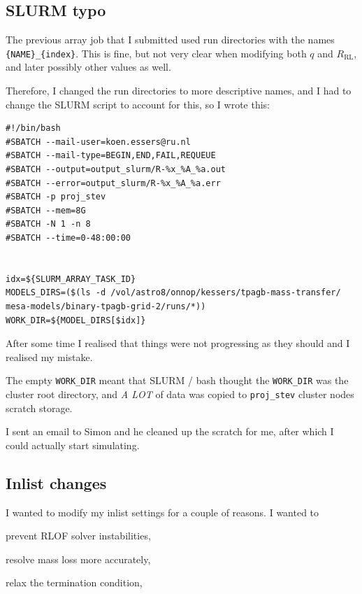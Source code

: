 \documentclass[a4paper,10pt]{article}
\begin{document}
\subsection{SLURM typo}
The previous array job that I submitted used run directories with the names \lstinline[style=output, breaklines=true]|{NAME}_{index}|. This is fine, but not very clear when modifying both \(q\) and \(R _\text{RL}\), and later possibly other values as well.

Therefore, I changed the run directories to more descriptive names, and I had to change the SLURM script to account for this, so I wrote this:

\begin{verbatim}
#!/bin/bash
#SBATCH --mail-user=koen.essers@ru.nl
#SBATCH --mail-type=BEGIN,END,FAIL,REQUEUE
#SBATCH --output=output_slurm/R-%x_%A_%a.out
#SBATCH --error=output_slurm/R-%x_%A_%a.err
#SBATCH -p proj_stev
#SBATCH --mem=8G
#SBATCH -N 1 -n 8 
#SBATCH --time=0-48:00:00


idx=${SLURM_ARRAY_TASK_ID}
MODELS_DIRS=($(ls -d /vol/astro8/onnop/kessers/tpagb-mass-transfer/ mesa-models/binary-tpagb-grid-2/runs/*))
WORK_DIR=${MODEL_DIRS[$idx]}
\end{verbatim}

After some time I realised that things were not progressing as they should and I realised my mistake.

The empty \lstinline[style=output, breaklines=true]|WORK_DIR| meant that SLURM / bash thought the \lstinline[style=output, breaklines=true]|WORK_DIR| was the cluster root directory, and \emph{A LOT} of data was copied to \lstinline[style=output, breaklines=true]|proj_stev| cluster nodes scratch storage.

I sent an email to Simon and he cleaned up the scratch for me, after which I could actually start simulating.

\subsection{Inlist changes}

I wanted to modify my inlist settings for a couple of reasons. I wanted to
\begin{enumd}
    \item prevent RLOF solver instabilities,
    \item  resolve mass loss more accurately,
    \item relax the termination condition,
\end{enumd}
\end{document}
